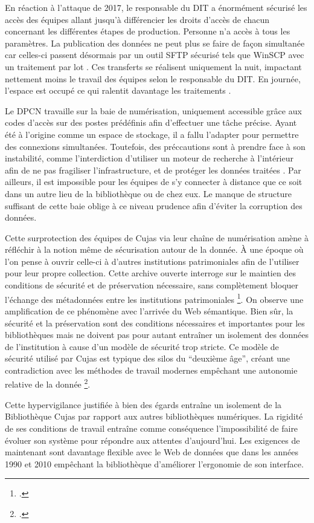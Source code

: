En réaction à l'attaque de 2017, le responsable du \ac{DIT} a énormément sécurisé les accès des équipes allant jusqu'à différencier les droits d'accès de chacun concernant les différentes étapes de production. Personne n'a accès à tous les paramètres. La publication des données ne peut plus se faire de façon simultanée car celles-ci passent désormais par un outil \ac{SFTP} sécurisé tels que WinSCP avec un traitement par lot . Ces transferts se réalisent uniquement la nuit, impactant nettement moins le travail des équipes selon le responsable du \ac{DIT}. En journée, l'espace est occupé ce qui ralentit davantage les traitements .

Le \ac{DPCN} travaille sur la baie de numérisation, uniquement accessible grâce aux codes d'accès sur des postes prédéfinis afin d'effectuer une tâche précise. Ayant été à l'origine comme un espace de stockage, il a fallu l'adapter pour permettre des connexions simultanées. Toutefois, des préccautions sont à prendre face à son instabilité, comme l'interdiction d'utiliser un moteur de recherche à l'intérieur afin de ne pas fragiliser l'infrastructure, et de protéger les données traitées . Par ailleurs, il est impossible pour les équipes de s'y connecter à distance que ce soit dans un autre lieu de la bibliothèque ou de chez eux. Le manque de structure suffisant de cette baie oblige à ce niveau prudence afin d'éviter la corruption des données.
 
Cette surprotection des équipes de Cujas via leur chaîne de numérisation amène à réfléchir à la notion même de sécurisation autour de la donnée. À une époque où l'on pense à ouvrir celle-ci à d'autres institutions patrimoniales afin de l'utiliser pour leur propre collection. Cette archive ouverte interroge sur le maintien des conditions de sécurité et de préservation nécessaire, sans complètement bloquer l'échange des métadonnées entre les institutions patrimoniales \footcite{bermesWebSemantiqueBibliotheque2013}. On observe une amplification de ce phénomène avec l'arrivée du Web sémantique. Bien sûr, la sécurité et la préservation sont des conditions nécessaires et importantes pour les bibliothèques mais ne doivent pas pour autant entraîner un isolement des données de l'institution à cause d'un modèle de sécurité trop stricte. Ce modèle de sécurité utilisé par Cujas est typique des silos du \enquote{deuxième âge}, créant une contradiction avec les méthodes de travail modernes empêchant une autonomie relative de la donnée \footcite{bermesTroisAgesNumerique}. 

Cette hypervigilance justifiée à bien des égards entraîne un isolement de la Bibliothèque Cujas par rapport aux autres bibliothèques numériques. La rigidité de ses conditions de travail entraîne comme conséquence l'impossibilité de faire évoluer son système pour répondre aux attentes d'aujourd'hui. Les exigences de maintenant sont davantage flexible avec le Web de données que dans les années 1990 et 2010 empêchant la bibliothèque d'améliorer l'ergonomie de son interface.